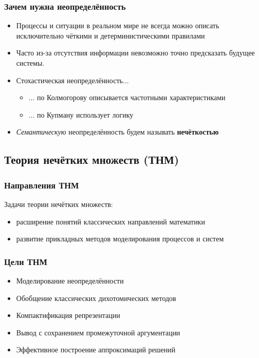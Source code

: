 \documentclass{beamer}
\begin{document}
\begin{frame}\frametitle{Зачем нужна неопределённость}
    \begin{itemize}
        \item Процессы и ситуации в реальном мире не всегда можно описать исключительно чёткими и детерминистическими правилами
        \item Часто из-за отсутствия информации невозможно точно предсказать будущее системы.
        \item Стохастическая неопределённость...
        \begin{itemize}
            \item ... по Колмогорову описывается частотными характеристиками
            \item ... по Купману использует логику
        \end{itemize}
        \item \textit{Семантическую} неопределённость будем называть \textbf{нечёткостью}
    \end{itemize}

\end{frame}

\subsection{Теория нечётких множеств (ТНМ)}

\begin{frame}\frametitle{Направления ТНМ}
    Задачи теории нечётких множеств:
    \begin{itemize}
        \item расширение понятий классических направлений математики
        \item развитие прикладных методов моделирования процессов и систем
    \end{itemize}
\end{frame}

\begin{frame}\frametitle{Цели ТНМ}
    \begin{itemize}
        \item Моделирование неопределённости
        \item Обобщение классических дихотомических методов
        \item Компактификация репрезентации
        \item Вывод с сохранением промежуточной аргументации
        \item Эффективное построение аппроксимаций решений
    \end{itemize}
\end{frame}
\end{document}
